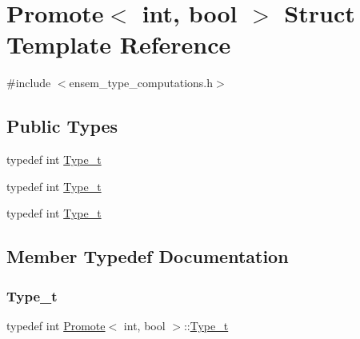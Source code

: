 \hypertarget{structPromote_3_01int_00_01bool_01_4}{}\section{Promote$<$ int, bool $>$ Struct Template Reference}
\label{structPromote_3_01int_00_01bool_01_4}


{\ttfamily \#include $<$ensem\+\_\+type\+\_\+computations.\+h$>$}

\subsection*{Public Types}
\begin{DoxyCompactItemize}
\item 
typedef int \mbox{\hyperlink{structPromote_3_01int_00_01bool_01_4_ac7c77d48ab422ab631e128719c53a30b}{Type\+\_\+t}}
\item 
typedef int \mbox{\hyperlink{structPromote_3_01int_00_01bool_01_4_ac7c77d48ab422ab631e128719c53a30b}{Type\+\_\+t}}
\item 
typedef int \mbox{\hyperlink{structPromote_3_01int_00_01bool_01_4_ac7c77d48ab422ab631e128719c53a30b}{Type\+\_\+t}}
\end{DoxyCompactItemize}


\subsection{Member Typedef Documentation}
\mbox{\label{structPromote_3_01int_00_01bool_01_4_ac7c77d48ab422ab631e128719c53a30b}} 
\subsubsection{\texorpdfstring{Type\_t}{Type\_t}\hspace{0.1cm}{\footnotesize\ttfamily [1/3]}}
{\footnotesize\ttfamily typedef int \mbox{\hyperlink{structPromote}{Promote}}$<$ int, bool $>$\+::\mbox{\hyperlink{structPromote_3_01int_00_01bool_01_4_ac7c77d48ab422ab631e128719c53a30b}{Type\+\_\+t}}}

\mbox{\label{structPromote_3_01int_00_01bool_01_4_ac7c77d48ab422ab631e128719c53a30b}} 
